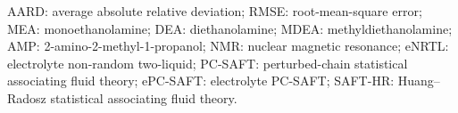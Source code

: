 AARD: average absolute relative deviation; RMSE: root-mean-square error; MEA: monoethanolamine; DEA: diethanolamine; MDEA: methyldiethanolamine; AMP: 2-amino-2-methyl-1-propanol; NMR: nuclear magnetic resonance; eNRTL: electrolyte non-random two-liquid; PC-SAFT: perturbed-chain statistical associating fluid theory; ePC-SAFT: electrolyte PC-SAFT; SAFT-HR: Huang--Radosz statistical associating fluid theory.
